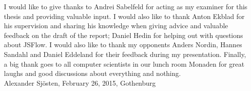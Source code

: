 \thispagestyle{empty}

\begin{acknowledgements}
I would like to give thanks to Andrei Sabelfeld for acting as my examiner for this thesis and providing valuable input. I would also like to thank Anton Ekblad for his supervision and sharing his knowledge when giving advice and valuable feedback on the draft of the report; Daniel Hedin for helping out with questions about JSFlow. I would also like to thank my opponents Anders Nordin, Hannes Sandahl and Daniel Eddeland for their feedback during my presentation. Finally, a big thank goes to all computer scientists in our lunch room Monaden for great laughs and good discussions about everything and nothing. \\[1cm]

\hfill Alexander Sjösten, February 26, 2015, Gothenburg
\end{acknowledgements}
